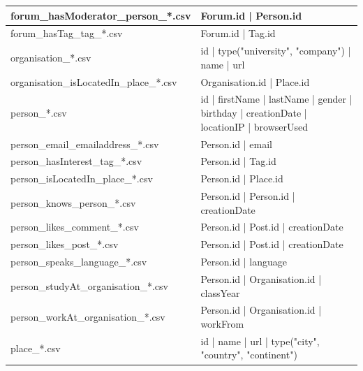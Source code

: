 \begin{table}[htbp]
\begin{tabular}{|p{4.6cm}|p{9.8cm}|}
    	forum\_hasModerator\_person\_*.csv      & Forum.id | Person.id                                                                    \\ \hline
    	forum\_hasTag\_tag\_*.csv               & Forum.id | Tag.id                                                                       \\ \hline
    	organisation\_*.csv                     & id | type({"university", "company"}) | name | url                                       \\ \hline
    	organisation\_isLocatedIn\_place\_*.csv & Organisation.id | Place.id                                                              \\ \hline
    	person\_*.csv                           & id | firstName | lastName | gender | birthday | creationDate | locationIP | browserUsed \\ \hline
    	person\_email\_emailaddress\_*.csv      & Person.id | email                                                                       \\ \hline
    	person\_hasInterest\_tag\_*.csv         & Person.id | Tag.id                                                                      \\ \hline
    	person\_isLocatedIn\_place\_*.csv       & Person.id | Place.id                                                                    \\ \hline
    	person\_knows\_person\_*.csv            & Person.id | Person.id | creationDate                                                    \\ \hline
    	person\_likes\_comment\_*.csv           & Person.id | Post.id | creationDate                                                      \\ \hline
    	person\_likes\_post\_*.csv              & Person.id | Post.id | creationDate                                                      \\ \hline
    	person\_speaks\_language\_*.csv         & Person.id | language                                                                    \\ \hline
    	person\_studyAt\_organisation\_*.csv    & Person.id | Organisation.id | classYear                                                 \\ \hline
    	person\_workAt\_organisation\_*.csv     & Person.id | Organisation.id | workFrom                                                  \\ \hline
    	place\_*.csv                            & id | name | url | type({"city", "country", "continent"})                                \\ \hline

\end{tabular}
\end{table}

